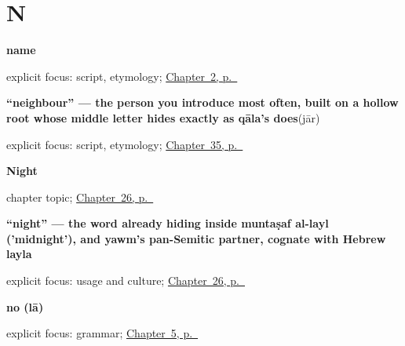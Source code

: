 \section*{N}

\noindent\begin{minipage}[t]{\linewidth}
\raggedright
\textbf{name}\enspace\emph{}\par
\footnotesize explicit focus: script, etymology; \hyperref[ch:introductions]{Chapter~2, p.~\pageref*{ch:introductions}}
\end{minipage}\par\smallskip

\noindent\begin{minipage}[t]{\linewidth}
\raggedright
\textbf{\textquotedblleft{}neighbour\textquotedblright{} — the person you introduce most often, built on a hollow root whose middle letter hides exactly as qāla's does}\enspace\emph{}\enspace(jār)\par
\footnotesize explicit focus: script, etymology; \hyperref[ch:ar-people-you-introduce]{Chapter~35, p.~\pageref*{ch:ar-people-you-introduce}}
\end{minipage}\par\smallskip

\noindent\begin{minipage}[t]{\linewidth}
\raggedright
\textbf{Night}\par
\footnotesize chapter topic; \hyperref[ch:ar-night]{Chapter~26, p.~\pageref*{ch:ar-night}}
\end{minipage}\par\smallskip

\noindent\begin{minipage}[t]{\linewidth}
\raggedright
\textbf{\textquotedblleft{}night\textquotedblright{} — the word already hiding inside muntaṣaf al-layl ('midnight'), and yawm's pan-Semitic partner, cognate with Hebrew layla}\enspace\emph{}\par
\footnotesize explicit focus: usage and culture; \hyperref[ch:ar-night]{Chapter~26, p.~\pageref*{ch:ar-night}}
\end{minipage}\par\smallskip

\noindent\begin{minipage}[t]{\linewidth}
\raggedright
\textbf{no (lā)}\enspace\emph{}\par
\footnotesize explicit focus: grammar; \hyperref[ch:ar-yes-and-no]{Chapter~5, p.~\pageref*{ch:ar-yes-and-no}}
\end{minipage}\par\smallskip


